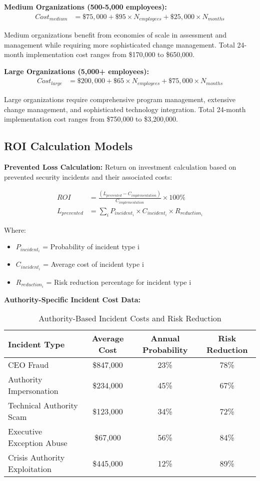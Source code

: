 \documentclass[11pt,a4paper]{article}
\begin{document}
\textbf{Medium Organizations (500-5,000 employees):}
\begin{align}
Cost_{medium} &= \$75,000 + \$95 \times N_{employees} + \$25,000 \times N_{months}
\end{align}

Medium organizations benefit from economies of scale in assessment and management while requiring more sophisticated change management. Total 24-month implementation cost ranges from \$170,000 to \$650,000.

\textbf{Large Organizations (5,000+ employees):}
\begin{align}
Cost_{large} &= \$200,000 + \$65 \times N_{employees} + \$75,000 \times N_{months}
\end{align}

Large organizations require comprehensive program management, extensive change management, and sophisticated technology integration. Total 24-month implementation cost ranges from \$750,000 to \$3,200,000.

\subsection{ROI Calculation Models}

\textbf{Prevented Loss Calculation:}
Return on investment calculation based on prevented security incidents and their associated costs:

\begin{align}
ROI &= \frac{(L_{prevented} - C_{implementation})}{C_{implementation}} \times 100\% \\
L_{prevented} &= \sum_{i} P_{incident_i} \times C_{incident_i} \times R_{reduction_i}
\end{align}

Where:
\begin{itemize}
\item $P_{incident_i}$ = Probability of incident type i
\item $C_{incident_i}$ = Average cost of incident type i
\item $R_{reduction_i}$ = Risk reduction percentage for incident type i
\end{itemize}

\textbf{Authority-Specific Incident Cost Data:}
\begin{table}[H]
\centering
\caption{Authority-Based Incident Costs and Risk Reduction}
\begin{tabular}{lccc}
\toprule
Incident Type & Average Cost & Annual Probability & Risk Reduction \\
\midrule
CEO Fraud & \$847,000 & 23\% & 78\% \\
Authority Impersonation & \$234,000 & 45\% & 67\% \\
Technical Authority Scam & \$123,000 & 34\% & 72\% \\
Executive Exception Abuse & \$67,000 & 56\% & 84\% \\
Crisis Authority Exploitation & \$445,000 & 12\% & 89\% \\
\bottomrule
\end{tabular}
\end{table}
\end{document}
